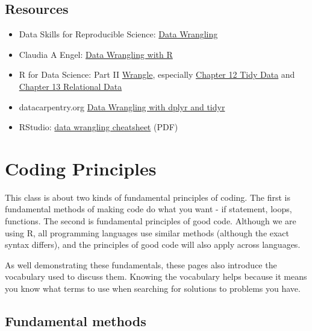 \documentclass[
]{book}
\providecommand{\tightlist}{%
  \setlength{\itemsep}{0pt}\setlength{\parskip}{0pt}}
\begin{document}
\hypertarget{resources-4}{%
\section{Resources}\label{resources-4}}

\begin{itemize}
\tightlist
\item
  Data Skills for Reproducible Science: \href{https://psyteachr.github.io/msc-data-skills/dplyr.html}{Data Wrangling}
\item
  Claudia A Engel: \href{https://cengel.github.io/R-data-wrangling/dplyr.html}{Data Wrangling with R}
\item
  R for Data Science: Part II \href{https://r4ds.had.co.nz/wrangle-intro.html}{Wrangle}, especially \href{https://r4ds.had.co.nz/tidy-data.html}{Chapter 12 Tidy Data} and \href{https://r4ds.had.co.nz/relational-data.html}{Chapter 13 Relational Data}
\item
  datacarpentry.org \href{https://datacarpentry.org/r-socialsci/03-dplyr-tidyr/index.html}{Data Wrangling with dplyr and tidyr}
\item
  RStudio: \href{https://www.rstudio.com/wp-content/uploads/2015/02/data-wrangling-cheatsheet.pdf}{data wrangling cheatsheet} (PDF)
\end{itemize}

\hypertarget{coding-principles}{%
\chapter{Coding Principles}\label{coding-principles}}

This class is about two kinds of fundamental principles of coding. The first is fundamental methods of making code do what you want - if statement, loops, functions. The second is fundamental principles of good code. Although we are using R, all programming languages use similar methods (although the exact syntax differs), and the principles of good code will also apply across languages.

As well demonstrating these fundamentals, these pages also introduce the vocabulary used to discuss them. Knowing the vocabulary helps because it means you know what terms to use when searching for solutions to problems you have.

\hypertarget{fundamental-methods}{%
\section{Fundamental methods}\label{fundamental-methods}}
\end{document}

